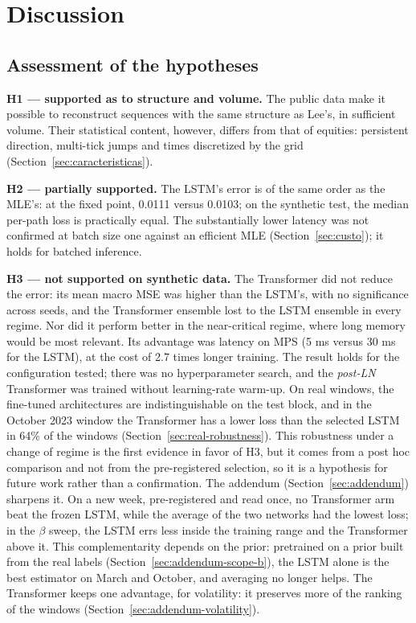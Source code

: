 \chapter{Discussion}

\section{Assessment of the hypotheses}

\textbf{H1 --- supported as to structure and volume.} The public data make it
possible to reconstruct sequences with the same structure as Lee's, in sufficient
volume. Their statistical content, however, differs from that of equities: persistent
direction, multi-tick jumps and times discretized by the grid
(Section~\ref{sec:caracteristicas}).

\textbf{H2 --- partially supported.} The LSTM's error is of the same order as the
MLE's: at the fixed point, 0.0111 versus 0.0103; on the synthetic test, the median
per-path loss is practically equal. The substantially lower latency was not confirmed
at batch size one against an efficient MLE (Section~\ref{sec:custo}); it holds for
batched inference.

\textbf{H3 --- not supported on synthetic data.} The Transformer did not reduce the
error: its mean macro MSE was higher than the LSTM's, with no significance across
seeds, and the Transformer ensemble lost to the LSTM ensemble in every regime. Nor
did it perform better in the near-critical regime, where long memory would be most
relevant. Its advantage was latency on MPS (5 ms versus 30 ms for the LSTM), at the
cost of 2.7 times longer training. The result holds for the configuration tested;
there was no hyperparameter search, and the \emph{post-LN} Transformer was trained
without learning-rate warm-up. On real windows, the fine-tuned architectures are indistinguishable on the test block, and in the October 2023
window the Transformer has a lower loss than the selected LSTM in 64\% of the windows
(Section~\ref{sec:real-robustness}). This robustness under a change of regime is the first
evidence in favor of H3, but it comes from a post hoc comparison and not from the
pre-registered selection, so it is a hypothesis for future work rather than a confirmation.
The addendum (Section~\ref{sec:addendum}) sharpens it. On a new week, pre-registered and read
once, no Transformer arm beat the frozen LSTM, while the average of the two networks had the
lowest loss; in the $\beta$ sweep, the LSTM errs less inside the training range and the
Transformer above it. This complementarity depends on the prior: pretrained on a prior built from the real labels
(Section~\ref{sec:addendum-scope-b}), the LSTM alone is the best estimator on March and
October, and averaging no longer helps. The Transformer keeps one advantage, for volatility:
it preserves more of the ranking of the windows (Section~\ref{sec:addendum-volatility}).

